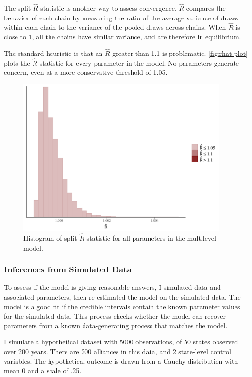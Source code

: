 \documentclass[12pt]{article}
\begin{document}
The split $\hat{R}$ statistic is another way to assess convergence. 
$\hat{R}$ compares the behavior of each chain by measuring the ratio of the average variance of draws within each chain to the variance of the pooled draws across chains. 
When $\hat{R}$ is close to 1, all the chains have similar variance, and are therefore in equilibrium. 


The standard heuristic is that an $\hat{R}$ greater than 1.1 is problematic. 
\autoref{fig:rhat-plot} plots the $\hat{R}$ statistic for every parameter in the model. 
No parameters generate concern, even at a more conservative threshold of 1.05. 


\begin{figure}[htbp]
	\centering
		\includegraphics[width=0.95\textwidth]{rhat-plot.pdf}
	\caption{Histogram of split $\hat{R}$ statistic for all parameters in the multilevel model.}
	\label{fig:rhat-plot}
\end{figure}


\subsubsection{Inferences from Simulated Data}


To assess if the model is giving reasonable answers, I simulated data and associated parameters, then re-estimated the model on the simulated data.
The model is a good fit if the credible intervals contain the known parameter values for the simulated data. 
This process checks whether the model can recover parameters from a known data-generating process that matches the model. 


I simulate a hypothetical dataset with 5000 observations, of 50 states observed over 200 years. 
There are 200 alliances in this data, and 2 state-level control variables. 
The hypothetical outcome is drawn from a Cauchy distribution with mean 0 and a scale of .25. 
\end{document}
